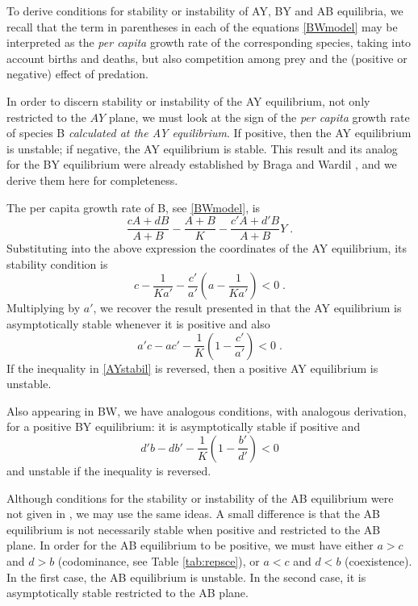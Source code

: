 \documentclass[12pt]{article}
\theoremstyle{definition}
\begin{document}
To derive conditions for stability or instability of AY, BY and AB equilibria, we recall that the term in parentheses in each of the equations \eqref{BWmodel} may be interpreted as the \emph{per capita} growth rate of the corresponding species, taking into account births and deaths, but also competition among prey and the (positive or negative) effect of predation. 

In order to discern stability or instability of the AY equilibrium, not only restricted to the $AY$ plane, we must look at the sign of the \emph{per capita} growth rate of species B \emph{calculated at the AY equilibrium}. If positive, then the AY equilibrium is unstable; if negative, the AY equilibrium is stable. This result and its analog for the BY equilibrium were already established by Braga and Wardil \cite{bw}, and we derive them here for completeness.

The per capita growth rate of B, see \eqref{BWmodel}, is
\[\frac{cA + dB}{A + B} - \frac{A + B}{K} - \frac{c'A + d'B}{A + B}Y\;.\]
Substituting into the above expression the coordinates of the AY equilibrium, its stability condition is
\[c- \frac{1}{Ka'}- \frac{c'}{a'}(a- \frac{1}{Ka'})<0\;.\]
Multiplying by $a'$, we recover the result presented in \cite{bw} that the AY equilibrium is asymptotically stable whenever it is positive and also
\begin{equation} \label{AYstabil}
	a'c-ac'-\frac{1}{K}(1-\frac{c'}{a'})<0\;.
\end{equation}
If the inequality in \eqref{AYstabil} is reversed, then a positive AY equilibrium is unstable.

Also appearing in BW, we have analogous conditions, with analogous derivation, for a positive BY equilibrium: it is asymptotically stable if positive and
\begin{equation} \label{BYstabil}
	d'b-db'-\frac{1}{K}(1-\frac{b'}{d'})<0
\end{equation}
and unstable if the inequality is reversed.

Although conditions for the stability or instability of the AB  equilibrium were not given in \cite{bw}, we may use the same ideas. A small difference is that the AB equilibrium is not necessarily stable when positive and restricted to the AB plane. In order for the AB equilibrium to be positive, we must have either $a>c$ and $d>b$ (codominance, see Table \ref{tab:repsce}), or $a<c$ and $d<b$ (coexistence). In the first case, the AB equilibrium is unstable. In the second case, it is asymptotically stable restricted to the AB plane.
\end{document}
